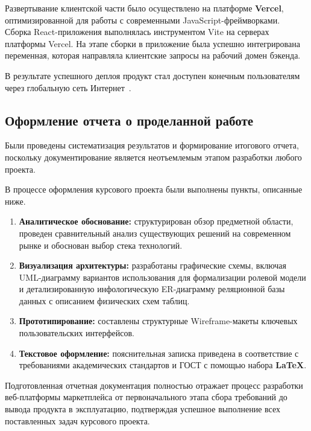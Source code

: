 Развертывание клиентской части было осуществлено на платформе \textbf{Vercel}, оптимизированной для работы с современными JavaScript-фреймворками. Сборка React-приложения 
выполнялась инструментом Vite на серверах платформы Vercel. На этапе сборки в приложение была успешно интегрирована переменная, которая направляла
клиентские запросы на рабочий домен бэкенда.

В результате успешного деплоя продукт стал доступен конечным пользователям через глобальную сеть Интернет~\cite{deploy_host}.

\subsection{Оформление отчета о проделанной работе}

Были проведены систематизация результатов и формирование итогового отчета, поскольку документирование является неотъемлемым этапом разработки любого проекта.

В процессе оформления курсового проекта были выполнены пункты, описанные ниже.
\begin{enumerate}
    \item \textbf{Аналитическое обоснование:} структурирован обзор предметной области, проведен сравнительный анализ существующих решений на современном рынке и обоснован 
	выбор стека технологий.
    \item \textbf{Визуализация архитектуры:} разработаны графические схемы, включая UML-диаграмму вариантов использования для формализации ролевой модели и 
	детализированную инфологическую ER-диаграмму реляционной базы данных с описанием физических схем таблиц.
    \item \textbf{Прототипирование:} составлены структурные Wireframe-макеты ключевых пользовательских интерфейсов.
    \item \textbf{Текстовое оформление:} пояснительная записка приведена в соответствие с требованиями академических стандартов и ГОСТ с помощью набора \textbf{LaTeX}.
\end{enumerate}

Подготовленная отчетная документация полностью отражает процесс разработки веб-платформы маркетплейса от первоначального этапа сбора требований до вывода продукта в 
эксплуатацию, подтверждая успешное выполнение всех поставленных задач курсового проекта.

